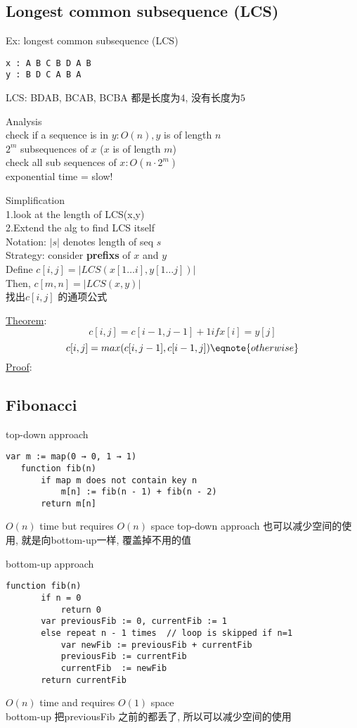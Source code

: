 \documentclass{article}
\begin{document}
\subsection{Longest common subsequence (LCS)}
Ex: longest common subsequence (LCS)
\begin{verbatim}
x : A B C B D A B
y : B D C A B A
\end{verbatim}
LCS: BDAB, BCAB, BCBA 都是长度为$4$, 没有长度为$5$

\bigskip
Analysis\\
check if a sequence is in $y:O(n), y$ is of length $n$\\
$2^m$ subsequences of $x$ ($x$ is of length $m$)\\
check all sub sequences of $x: O(n \cdot 2^m)$\\
exponential time = slow!

\bigskip
Simplification\\
1.look at the length of LCS(x,y)\\
2.Extend the alg to find LCS itself\\
Notation: $|s|$ denotes length of seq $s$\\
Strategy: consider \textbf{prefixs} of $x$ and $y$\\
Define $c[i,j] = |LCS(x[1… i], y[1…j])|$\\
Then, $c[m,n] = |LCS(x,y)|$\\
找出$c[i,j]$ 的通项公式

\bigskip
\underline{Theorem}:
$$
c[i,j] = c[i-1,j-1] + 1 if x[i] = y[j]
$$
$$
c[i,j] =max(c[i,j-1], c[i-1,j]) \eqnote{otherwise}
$$
\underline{Proof}:

\subsection{Fibonacci}
top-down approach
\begin{verbatim}
var m := map(0 → 0, 1 → 1)
   function fib(n)
       if map m does not contain key n
           m[n] := fib(n - 1) + fib(n - 2)
       return m[n]
\end{verbatim}
$O(n)$ time but requires $O(n)$ space
top-down approach 也可以减少空间的使用, 就是向bottom-up一样, 覆盖掉不用的值

\bigskip
bottom-up approach
\begin{verbatim}
function fib(n)
       if n = 0
           return 0
       var previousFib := 0, currentFib := 1
       else repeat n - 1 times  // loop is skipped if n=1
           var newFib := previousFib + currentFib
           previousFib := currentFib
           currentFib  := newFib
       return currentFib
\end{verbatim}
$O(n)$ time and requires $O(1)$ space\\
bottom-up 把previousFib 之前的都丢了, 所以可以减少空间的使用
\end{document}

